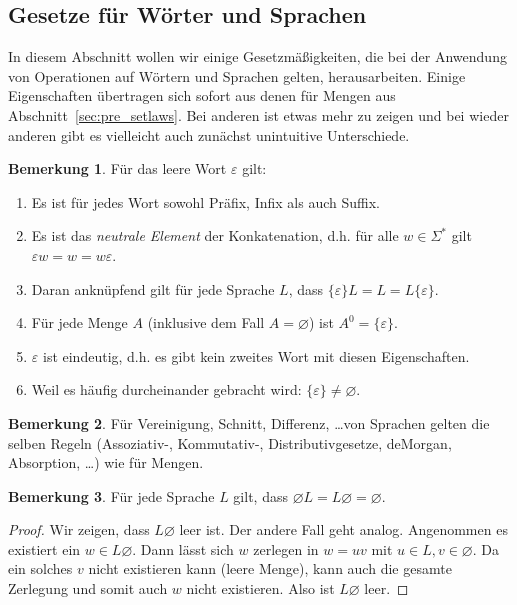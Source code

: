 \documentclass[11pt, a4paper]{article}
\theoremstyle{definition}
\newtheorem*{remark*}{Bemerkung}
\theoremstyle{plain}
\numberwithin{equation}{section}
\let\emptyset\varnothing
\begin{document}
\subsection{Gesetze für Wörter und Sprachen}\label{sec:awl_wordlaws}
In diesem Abschnitt wollen wir einige Gesetzmäßigkeiten, die bei der Anwendung von Operationen auf Wörtern und Sprachen gelten, herausarbeiten. Einige Eigenschaften über\-tra\-gen sich sofort aus denen für Mengen aus Abschnitt~\ref{sec:pre_setlaws}. Bei anderen ist etwas mehr zu zeigen und bei wieder anderen gibt es vielleicht auch zunächst unintuitive Unterschiede.
\begin{remark*}
	Für das leere Wort $\varepsilon$ gilt:
	\begin{enumerate}
		\item Es ist für jedes Wort sowohl Präfix, Infix als auch Suffix.
		\item Es ist das \textit{neutrale Element} der Konkatenation, d.h. für alle $w \in \Sigma^\ast$ gilt $\varepsilon w = w = w \varepsilon$.
		\item Daran anknüpfend gilt für jede Sprache $L$, dass $ \{ \varepsilon \} L = L = L  \{ \varepsilon \}$.
		\item Für jede Menge $A$ (inklusive dem Fall $A = \emptyset$) ist $A^0 = \{ \varepsilon \}$.
		\item $\varepsilon$ ist eindeutig, d.h. es gibt kein zweites Wort mit diesen Eigenschaften.
		\item Weil es häufig durcheinander gebracht wird: $\{ \varepsilon \} \neq \emptyset$.
	\end{enumerate}
\end{remark*}
\begin{remark*}
	Für Vereinigung, Schnitt, Differenz, \ldots von Sprachen gelten die selben Regeln (Assoziativ-, Kommutativ-, Distributivgesetze, deMorgan, Absorption, \ldots) wie für Mengen.
\end{remark*}
\begin{remark*}
	Für jede Sprache $L$ gilt, dass $\emptyset L = L \emptyset = \emptyset$.
	\begin{proof}
		Wir zeigen, dass $L \emptyset$ leer ist. Der andere Fall geht analog. Angenommen es existiert ein $w \in L \emptyset$. Dann lässt sich $w$ zerlegen in $w = uv$ mit $u \in L, v \in \emptyset$. Da ein solches $v$ nicht existieren kann (leere Menge), kann auch die gesamte Zerlegung und somit auch $w$ nicht existieren. Also ist $L \emptyset$ leer.
	\end{proof}
\end{remark*}
\end{document}
